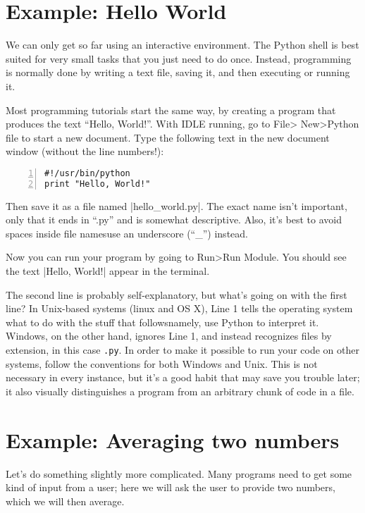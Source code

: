 \documentclass{article}
\begin{document}
\section{Example: Hello World}
We can only get so far using an interactive environment.  The Python shell is
best suited for very small tasks that you just need to do once.  Instead,
programming is normally done by writing a text file, saving it, and then
executing or running it.

Most programming tutorials start the same way, by creating a program that
produces the text ``Hello, World!''.  With IDLE running, go to File\textgreater
New\textgreater Python file to start a new document.  Type the following text in the new document
window (without the line numbers!):

\begin{Verbatim}[numbers=left]
#!/usr/bin/python
print "Hello, World!"
\end{Verbatim}

Then save it as a file named |hello_world.py|.  The exact name isn't important,
only that it ends in ``.py'' and is somewhat descriptive.  Also, it's best to
avoid spaces inside file names\textemdash use an underscore (``\_'') instead.

Now you can run your program by going to Run\textgreater Run Module.  You should
see the text |Hello, World!| appear in the terminal.

The second line is probably self-explanatory, but what's going on with the first
line?  In Unix-based systems (linux and OS X), Line 1 tells the operating system
what to do with the stuff that follows\textemdash namely, use Python to
interpret it.  Windows, on the other hand, ignores Line 1, and instead
recognizes files by extension, in this case \texttt{.py}.  In order to make it
possible to run your code on other systems, follow the conventions for both
Windows and Unix.  This is not necessary in every instance, but it's a good
habit that may save you trouble later; it also visually distinguishes a program from an arbitrary chunk of code in a file.

\section{Example: Averaging two numbers}

Let's do something slightly more complicated.  Many programs need to get some
kind of input from a user; here we will ask the user to provide two numbers,
which we will then average.
\end{document}
